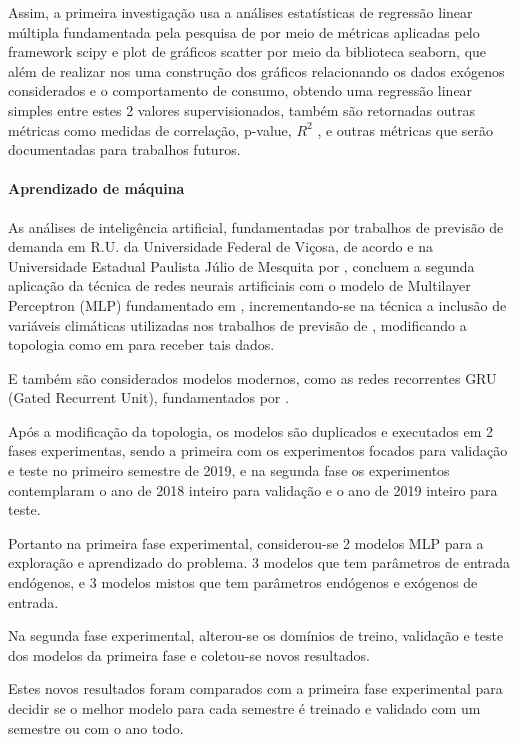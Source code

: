 \documentclass[	12pt, Times, openright, twoside, a4paper, english, brazil]{abntex2}
\begin{document}
          Assim, a primeira investigação usa a análises estatísticas de regressão linear múltipla fundamentada pela pesquisa de \cite{Clarice2011} por meio de métricas aplicadas pelo framework scipy e plot de gráficos scatter por meio da biblioteca seaborn, que além de realizar nos uma construção dos gráficos relacionando os dados exógenos considerados e o comportamento de consumo, obtendo uma regressão linear simples entre estes 2 valores supervisionados, também são retornadas outras métricas como medidas de correlação, p-value, $R^2$ , e outras métricas que serão documentadas para trabalhos futuros.

        \paragraph{Aprendizado de máquina}
          As análises de inteligência artificial, fundamentadas por trabalhos de previsão de demanda em R.U. da Universidade Federal de Viçosa, de acordo \cite{Lopes2008} e na Universidade Estadual Paulista Júlio de Mesquita por \cite{Rocha2011}, concluem a segunda aplicação da técnica de redes neurais artificiais com o modelo de Multilayer Perceptron (MLP) fundamentado em \cite{Haykin1994}, incrementando-se na técnica a inclusão de variáveis climáticas utilizadas nos trabalhos de previsão de  \cite{Almeida2013, RUAS2012, Silva2010}, modificando a topologia como em \cite{Lopes2008} para receber tais dados.
          
          E também são considerados modelos modernos, como as redes recorrentes GRU (Gated Recurrent Unit), fundamentados por \cite{DLB}.

          Após a modificação da topologia, os modelos são duplicados e executados em 2 fases experimentas, sendo a primeira com os experimentos focados para validação e teste no primeiro semestre de 2019, e na segunda fase os experimentos contemplaram o ano de 2018 inteiro para validação e o ano de 2019 inteiro para teste.
          
          Portanto na primeira fase experimental,  considerou-se 2 modelos MLP para a exploração e aprendizado do problema.
          3 modelos que tem parâmetros de entrada endógenos, e 3 modelos mistos que tem parâmetros endógenos e exógenos de entrada.
          
          Na segunda fase experimental, alterou-se os domínios de treino, validação e teste dos modelos da primeira fase e coletou-se novos resultados.
          
          Estes novos resultados foram comparados com a primeira fase experimental para decidir se o melhor modelo para cada semestre é treinado e validado com um semestre ou com o ano todo.
        
\end{document}
